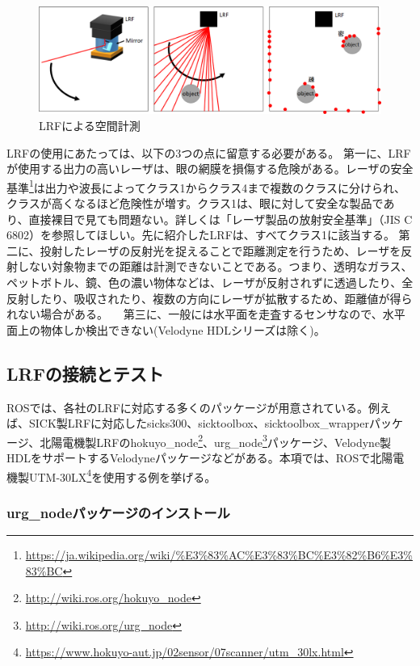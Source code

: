 \begin{figure}[htp]
  \centering
  \includegraphics[width=\columnwidth]{pictures/chapter8/pic_08_09.png}
  \caption{LRFによる空間計測}
\end{figure}

LRFの使用にあたっては、以下の3つの点に留意する必要がある。
第一に、LRFが使用する出力の高いレーザは、眼の網膜を損傷する危険がある。レーザの安全基準\footnote{\url{https://ja.wikipedia.org/wiki/\%E3\%83\%AC\%E3\%83\%BC\%E3\%82\%B6\%E3\%83\%BC}}は出力や波長によってクラス1からクラス4まで複数のクラスに分けられ、クラスが高くなるほど危険性が増す。クラス1は、眼に対して安全な製品であり、直接裸目で見ても問題ない。詳しくは「レーザ製品の放射安全基準」（JIS C 6802）を参照してほしい。先に紹介したLRFは、すべてクラス1に該当する。
第二に、投射したレーザの反射光を捉えることで距離測定を行うため、レーザを反射しない対象物までの距離は計測できないことである。つまり、透明なガラス、ペットボトル、鏡、色の濃い物体などは、レーザが反射されずに透過したり、全反射したり、吸収されたり、複数の方向にレーザが拡散するため、距離値が得られない場合がある。
　第三に、一般には水平面を走査するセンサなので、水平面上の物体しか検出できない(Velodyne HDLシリーズは除く)。

\subsection{LRFの接続とテスト}

ROSでは、各社のLRFに対応する多くのパッケージが用意されている。例えば、SICK製LRFに対応したsicks300、sicktoolbox、sicktoolbox\_wrapperパッケージ、北陽電機製LRFのhokuyo\_node\footnote{\url{http://wiki.ros.org/hokuyo\_node}}、urg\_node\footnote{\url{http://wiki.ros.org/urg\_node}}パッケージ、Velodyne製HDLをサポートするVelodyneパッケージなどがある。本項では、ROSで北陽電機製UTM-30LX\footnote{\url{https://www.hokuyo-aut.jp/02sensor/07scanner/utm\_30lx.html}}を使用する例を挙げる。

\subsubsection{urg\_nodeパッケージのインストール}

